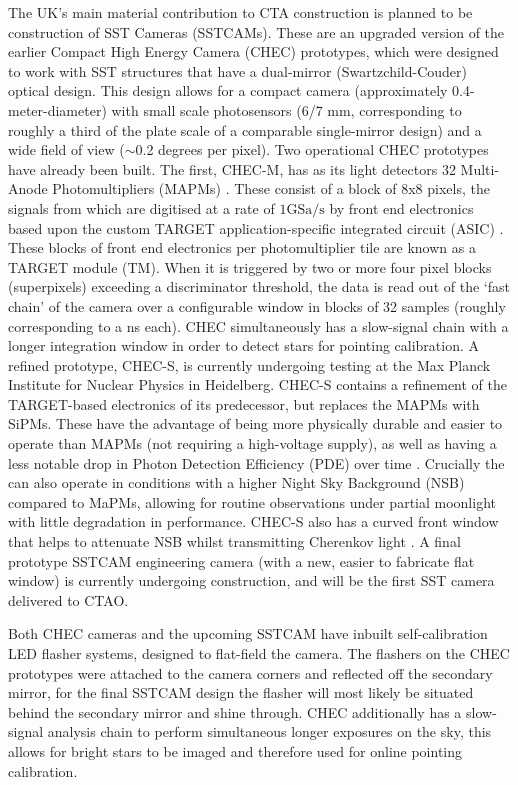 The UK's main material contribution to CTA construction is planned to be construction of SST Cameras (SSTCAMs). These are an upgraded version of the earlier Compact High Energy Camera (CHEC) prototypes, which were designed to work with SST structures that have a dual-mirror (Swartzchild-Couder) optical design. This design allows for a compact camera (approximately 0.4-meter-diameter) with small scale photosensors (6/7 mm, corresponding to roughly a third of the plate scale of a comparable single-mirror design) and a wide field of view ($\sim$0.2 degrees per pixel).  Two operational CHEC prototypes have already been built. The first, CHEC-M, has as its light detectors 32 Multi-Anode Photomultipliers (MAPMs) \cite{tomthesis}. These consist of a block of 8x8 pixels, the signals from which are digitised at a rate of $1\mathrm{GSa}/\mathrm{s}$ \cite{tomthesis} by front end electronics based upon the custom TARGET application-specific integrated circuit (ASIC) \cite{checmpaper}. These blocks of front end electronics per photomultiplier tile are known as a TARGET module (TM). When it is triggered by two or more four pixel blocks (superpixels) exceeding a discriminator threshold, the data is read out of the `fast chain' of the camera over a configurable window in blocks of 32 samples (roughly corresponding to a ns each). CHEC simultaneously has a slow-signal chain with a longer integration window in order to detect stars for pointing calibration. A refined prototype, CHEC-S, is currently undergoing testing at the Max Planck Institute for Nuclear Physics in Heidelberg. CHEC-S contains a refinement of the TARGET-based electronics of its predecessor, but replaces the MAPMs with SiPMs. These have the advantage of being more physically durable and easier to operate than MAPMs (not requiring a high-voltage supply), as well as having a less notable drop in Photon Detection Efficiency (PDE) over time \cite{factphotonstream}. Crucially the can also operate in conditions with a higher Night Sky Background (NSB) compared to MaPMs, allowing for routine observations under partial moonlight with little degradation in performance. CHEC-S also has a curved front window that helps to attenuate NSB whilst transmitting Cherenkov light \cite{ssticrc}. A final prototype SSTCAM engineering camera (with a new, easier to fabricate flat window) is currently undergoing construction, and will be the first SST camera delivered to CTAO.

Both CHEC cameras and the upcoming SSTCAM have inbuilt self-calibration LED flasher systems, designed to flat-field the camera. The flashers on the CHEC prototypes were attached to the camera corners and reflected off the secondary mirror, for the final SSTCAM design the flasher will most likely be situated behind the secondary mirror and shine through. CHEC additionally has a slow-signal analysis chain to perform simultaneous longer exposures on the sky, this allows for bright stars to be imaged and therefore used for online pointing calibration.

